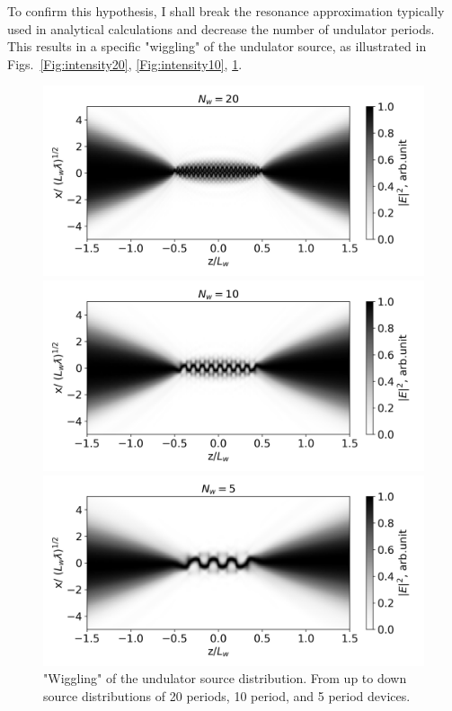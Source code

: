     To confirm this hypothesis, I shall break the resonance approximation typically used in analytical calculations and decrease the number of undulator periods. This results in a specific "wiggling" of the undulator source, as illustrated in Figs.~\ref{Fig:intensity20}, \ref{Fig:intensity10}, \ref{Fig:intensity5}. 
    \begin{figure}[p] 
        \centering
        \includegraphics[width=0.9\linewidth]{content/images/Synchrotron_Radiation/intensity_scan_N_w_20.png}
        \captionsetup{justification=centering}
        \caption{}
        \label{Fig:intensity20}
        
        \vspace{\floatsep} %
        
        \includegraphics[width=0.9\linewidth]{content/images/Synchrotron_Radiation/intensity_scan_N_w_10.png}
        \captionsetup{justification=centering}
        \caption{}
        \label{Fig:intensity10}
        
        \vspace{\floatsep} %
        \includegraphics[width=0.9\linewidth]{content/images/Synchrotron_Radiation/intensity_scan_N_w_5.png}
        \captionsetup{justification=centering}
        \caption{"Wiggling" of the undulator source distribution. From up to down source distributions of 20 periods, 10 period, and 5 period devices.}
        \label{Fig:intensity5}
    \end{figure}
